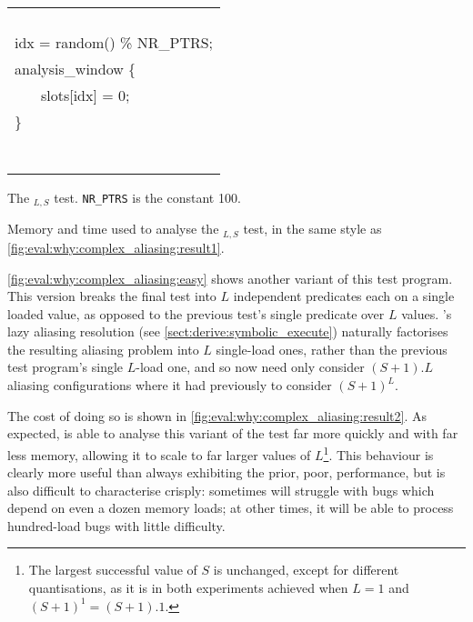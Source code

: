 \begin{sanefig}
{{{\begin{tabular}{ll}
        \\
        \\
        \\
        \\
        \\
        \multicolumn{2}{l}{idx = random() \% NR\_PTRS;}\\
        \multicolumn{2}{l}{analysis\_window \{} \\
        & slots[idx] = 0; \\
        \multicolumn{2}{l}{\}}\\
        \\
        \\
        \\
        \\
        \\
        \\
        \\
      \end{tabular}
    }
  }
  }
  {\hfill}
  \caption{The $_{L,S}$ test.
    \texttt{NR\_PTRS} is the constant 100.}
  \label{fig:eval:why:complex_aliasing:easy}
\end{sanefig}

\begin{sanefig}
  \caption{Memory and time used to analyse the
    $_{L,S}$ test, in the same style as
    \autoref{fig:eval:why:complex_aliasing:result1}.}
  \label{fig:eval:why:complex_aliasing:result2}
\end{sanefig}

\autoref{fig:eval:why:complex_aliasing:easy} shows another variant of
this test program.  This version breaks the final test into $L$
independent predicates each on a single loaded value, as opposed to
the previous test's single predicate over $L$ values.  {\Technique}'s
lazy aliasing resolution (see \autoref{sect:derive:symbolic_execute})
naturally factorises the resulting aliasing problem into $L$
single-load ones, rather than the previous test program's single
$L$-load one, and so {\technique} now need only consider $(S+1).L$
aliasing configurations where it had previously to consider $(S+1)^L$.

The cost of doing so is shown in
\autoref{fig:eval:why:complex_aliasing:result2}.  As expected,
        {\technique} is able to analyse this variant of the test far
        more quickly and with far less memory, allowing it to scale to
        far larger values of $L$\footnote{The largest successful value
          of $S$ is unchanged, except for different quantisations, as
          it is in both experiments achieved when $L=1$ and $(S+1)^1 =
          (S+1).1$.}.  This behaviour is clearly more useful than
        always exhibiting the prior, poor, performance, but is also
        difficult to characterise crisply: sometimes {\technique} will
        struggle with bugs which depend on even a dozen memory loads;
        at other times, it will be able to process hundred-load bugs
        with little difficulty.  

